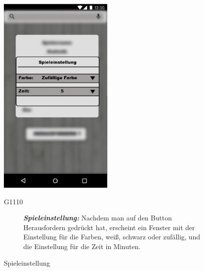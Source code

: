 \documentclass[parskip=full]{scrartcl}
\begin{document}
\begin{figure}[htp]
	\begin{minipage}[t]{6cm}
		\vspace{0pt}
		\includegraphics[height=100mm]{custom_match.png}
		\caption{Spieleinstellung}
		\label{fig:Spieleinstellung}
	\end{minipage}
	\hfill
	\begin{minipage}[t]{6cm}
		\vspace{0pt}
		\begin{description}
			\item[G1110]\textbf{\textit{Spieleinstellung: }} Nachdem man auf den Button Herausfordern gedrückt hat, erscheint ein Fenster mit der Einstellung für die Farben, weiß, schwarz oder zufällig, und die Einstellung für die Zeit in Minuten.
		\end{description}
	\end{minipage}
\end{figure}
\end{document}
